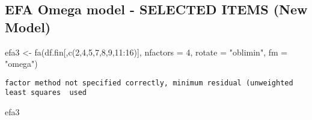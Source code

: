 \documentclass[
  letterpaper,
  DIV=11,
  numbers=noendperiod]{scrartcl}
\newenvironment{Shaded}{\begin{snugshade}}{\end{snugshade}}
\newcommand{\AttributeTok}[1]{\textcolor[rgb]{0.40,0.45,0.13}{#1}}
\newcommand{\DecValTok}[1]{\textcolor[rgb]{0.68,0.00,0.00}{#1}}
\newcommand{\FunctionTok}[1]{\textcolor[rgb]{0.28,0.35,0.67}{#1}}
\newcommand{\NormalTok}[1]{\textcolor[rgb]{0.00,0.23,0.31}{#1}}
\newcommand{\OtherTok}[1]{\textcolor[rgb]{0.00,0.23,0.31}{#1}}
\newcommand{\SpecialCharTok}[1]{\textcolor[rgb]{0.37,0.37,0.37}{#1}}
\newcommand{\StringTok}[1]{\textcolor[rgb]{0.13,0.47,0.30}{#1}}
\begin{document}
\subsection{EFA Omega model - SELECTED ITEMS (New
Model)}\label{efa-omega-model---selected-items-new-model}

\begin{Shaded}
\begin{Highlighting}[]
\NormalTok{efa3 }\OtherTok{\textless{}{-}} \FunctionTok{fa}\NormalTok{(df.fin[,}\FunctionTok{c}\NormalTok{(}\DecValTok{2}\NormalTok{,}\DecValTok{4}\NormalTok{,}\DecValTok{5}\NormalTok{,}\DecValTok{7}\NormalTok{,}\DecValTok{8}\NormalTok{,}\DecValTok{9}\NormalTok{,}\DecValTok{11}\SpecialCharTok{:}\DecValTok{16}\NormalTok{)], }\AttributeTok{nfactors =} \DecValTok{4}\NormalTok{, }\AttributeTok{rotate =} \StringTok{"oblimin"}\NormalTok{, }\AttributeTok{fm =} \StringTok{"omega"}\NormalTok{)}
\end{Highlighting}
\end{Shaded}

\begin{verbatim}
factor method not specified correctly, minimum residual (unweighted least squares  used
\end{verbatim}

\begin{Shaded}
\begin{Highlighting}[]
\NormalTok{efa3}
\end{Highlighting}
\end{Shaded}
\end{document}
